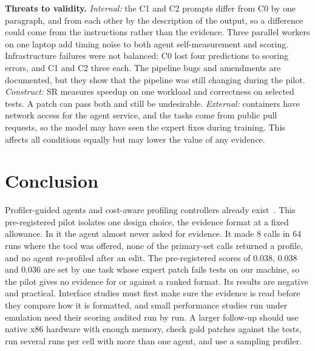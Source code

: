 \documentclass[conference]{IEEEtran}
\begin{document}
\textbf{Threats to validity.}
\emph{Internal:} the C1 and C2 prompts differ from C0 by one paragraph, and
from each other by the description of the output, so a difference could come
from the instructions rather than the evidence. Three parallel workers on one
laptop add timing noise to both agent self-measurement and scoring.
Infrastructure failures were not balanced: C0 lost four predictions to
scoring errors, and C1 and C2 three each. The pipeline bugs and amendments are
documented, but they show that the pipeline was still changing during the
pilot.
\emph{Construct:} SR measures speedup on one workload and correctness on
selected tests. A patch can pass both and still be undesirable.
\emph{External:} containers have network access for the agent service, and
the tasks come from public pull requests, so the model may have seen the
expert fixes during training. This affects all conditions equally but may
lower the value of any evidence.

\section{Conclusion}

Profiler-guided agents and cost-aware profiling controllers already
exist~\cite{deng2026perfagent,ding2026profileweaver}. This pre-registered pilot
isolates one design choice, the evidence format at a fixed allowance. In it the agent almost never asked for evidence. It made 8
calls in 64 runs where the tool was offered, none of the primary-set calls
returned a profile, and no agent re-profiled after an edit. The
pre-registered scores of 0.038, 0.038 and 0.036 are set by one task whose
expert patch fails tests on our machine, so the pilot gives no evidence for
or against a ranked format. Its results are negative and practical.
Interface studies must first make sure the evidence is read before they
compare how it is formatted, and small performance studies run under
emulation need their scoring audited run by run. A larger follow-up should
use native x86 hardware with enough memory, check gold patches against the
tests, run several runs per cell with more than one agent, and use a
sampling profiler.
\end{document}

